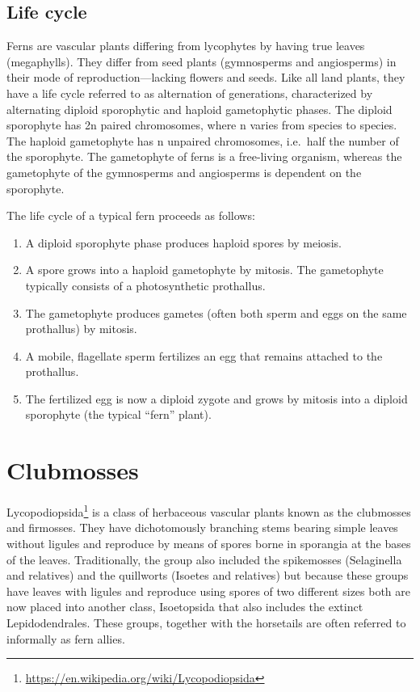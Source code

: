 \documentclass[]{book}
\providecommand{\tightlist}{%
  \setlength{\itemsep}{0pt}\setlength{\parskip}{0pt}}
\let\rmarkdownfootnote\footnote%
\def\footnote{\protect\rmarkdownfootnote}
\renewcommand{\href}[2]{#2\footnote{\url{#1}}}
\begin{document}
\hypertarget{life-cycle-2}{%
\subsection{Life cycle}\label{life-cycle-2}}

Ferns are vascular plants differing from lycophytes by having true leaves (megaphylls). They differ from seed plants (gymnosperms and angiosperms) in their mode of reproduction---lacking flowers and seeds. Like all land plants, they have a life cycle referred to as alternation of generations, characterized by alternating diploid sporophytic and haploid gametophytic phases. The diploid sporophyte has 2n paired chromosomes, where n varies from species to species. The haploid gametophyte has n unpaired chromosomes, i.e.~half the number of the sporophyte. The gametophyte of ferns is a free-living organism, whereas the gametophyte of the gymnosperms and angiosperms is dependent on the sporophyte.

The life cycle of a typical fern proceeds as follows:

\begin{enumerate}
\def\labelenumi{\arabic{enumi}.}
\tightlist
\item
  A diploid sporophyte phase produces haploid spores by meiosis.
\item
  A spore grows into a haploid gametophyte by mitosis. The gametophyte typically consists of a photosynthetic prothallus.
\item
  The gametophyte produces gametes (often both sperm and eggs on the same prothallus) by mitosis.
\item
  A mobile, flagellate sperm fertilizes an egg that remains attached to the prothallus.
\item
  The fertilized egg is now a diploid zygote and grows by mitosis into a diploid sporophyte (the typical ``fern'' plant).
\end{enumerate}

\hypertarget{clubmosses}{%
\section{Clubmosses}\label{clubmosses}}

\href{https://en.wikipedia.org/wiki/Lycopodiopsida}{Lycopodiopsida} is a class of herbaceous vascular plants known as the clubmosses and firmosses. They have dichotomously branching stems bearing simple leaves without ligules and reproduce by means of spores borne in sporangia at the bases of the leaves. Traditionally, the group also included the spikemosses (Selaginella and relatives) and the quillworts (Isoetes and relatives) but because these groups have leaves with ligules and reproduce using spores of two different sizes both are now placed into another class, Isoetopsida that also includes the extinct Lepidodendrales. These groups, together with the horsetails are often referred to informally as fern allies.
\end{document}
